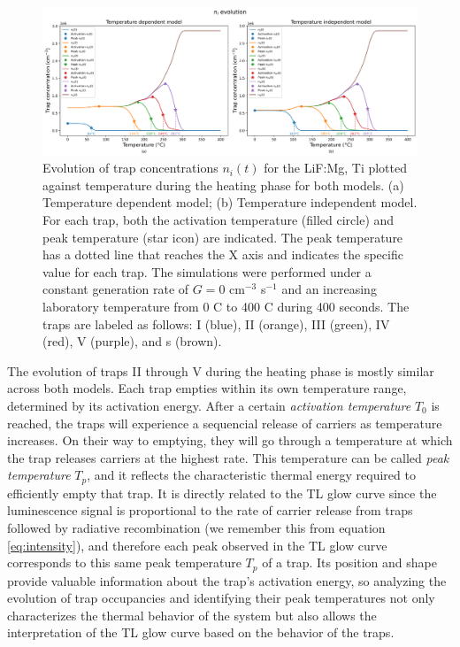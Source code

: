\begin{figure}[H]
    \centering
    \includegraphics[width=\textwidth]{Images/GC_ActivationAndPeakTemperatures.png}
    \caption{Evolution of trap concentrations $n_i(t)$ for the LiF:Mg, Ti plotted against temperature during the heating phase for both models. (a) Temperature dependent model; (b) Temperature independent model. For each trap, both the activation temperature (filled circle) and peak temperature (star icon) are indicated. The peak temperature has a dotted line that reaches the X axis and indicates the specific value for each trap. The simulations were performed under a constant generation rate of $G = 0$ cm$^{-3}$ s$^{-1}$ and an increasing laboratory temperature from 0 \textdegree C to 400 \textdegree C during 400 seconds. The traps are labeled as follows: I (blue), II (orange), III (green), IV (red), V (purple), and s (brown).}
    \label{fig:GC_ActivationAndPeakTemperatures}
\end{figure}

The evolution of traps II through V during the heating phase is mostly similar across both models. Each trap empties within its own temperature range, determined by its activation energy. After a certain \textit{activation temperature} $T_0$ is reached, the traps will experience a sequencial release of carriers as temperature increases. On their way to emptying, they will go through a temperature at which the trap releases carriers at the highest rate. This temperature can be called \textit{peak temperature} $T_p$, and it reflects the characteristic thermal energy required to efficiently empty that trap. It is directly related to the TL glow curve since the luminescence signal is proportional to the rate of carrier release from traps followed by radiative recombination (we remember this from equation \ref{eq:intensity}), and therefore each peak observed in the TL glow curve corresponds to this same peak temperature $T_p$ of a trap. Its position and shape provide valuable information about the trap's activation energy, so analyzing the evolution of trap occupancies and identifying their peak temperatures not only characterizes the thermal behavior of the system but also allows the interpretation of the TL glow curve based on the behavior of the traps.

